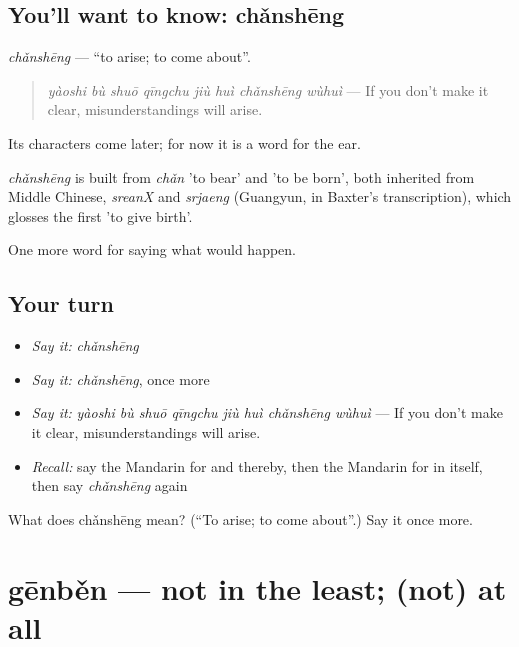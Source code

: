 \subsection*{You'll want to know: chǎnshēng}
\emph{chǎnshēng} — \textquotedblleft{}to arise; to come about\textquotedblright{}.

\begin{quote}
\emph{yàoshi bù shuō qīngchu jiù huì chǎnshēng wùhuì} — If you don't make it clear, misunderstandings will arise.
\end{quote}

Its characters come later; for now it is a word for the ear.

\begin{cousinweb}
\emph{chǎnshēng} is built from \emph{chǎn} 'to bear' and  'to be born', both inherited from Middle Chinese, \emph{sreanX} and \emph{srjaeng} (Guangyun, in Baxter's transcription), which glosses the first 'to give birth'.
\end{cousinweb}

\begin{grammarlens}[title={What you've built}]
One more word for saying what would happen.
\end{grammarlens}

\subsection*{Your turn}
\begin{itemize}
\raggedright
  \item \emph{Say it:} \emph{chǎnshēng}
  \item \emph{Say it:} \emph{chǎnshēng}, once more
  \item \emph{Say it:} \emph{yàoshi bù shuō qīngchu jiù huì chǎnshēng wùhuì} — If you don't make it clear, misunderstandings will arise.
  \item \emph{Recall:} say the Mandarin for and thereby, then the Mandarin for in itself, then say \emph{chǎnshēng} again
\end{itemize}

\begin{tcolorbox}[breakable,colback=teal!4,colframe=teal!35!black,title={Before you move on}]
What does chǎnshēng mean? (\textquotedblleft{}To arise; to come about\textquotedblright{}.) Say it once more.
\end{tcolorbox}
\section[gēnběn]{gēnběn — not in the least; (not) at all}

